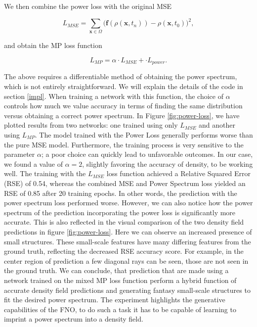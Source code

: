 \documentclass{article}
\begin{document}
We then combine the power loss with the original MSE

\begin{equation}
    L_{MSE} = \sum_{\mathbf{x} \in  \Omega} \Biggl(\mathbf{f}(\rho(\mathbf{x}, t_{n})) - \rho(\mathbf{x}, t_0)\Biggr)^2,
\end{equation}

and obtain the MP loss function

\begin{equation}
    L_{MP} = \alpha \cdot L_{MSE} + \cdot L_{power}.
\end{equation}

The above requires a differentiable method of obtaining the power spectrum, which is not entirely straightforward. We will explain the details of the code in section \ref{impl}. When training a network with this function, the choice of $\alpha$ controls how much we value accuracy in terms of finding the same distribution versus obtaining a correct power spectrum. In Figure \ref{fig:power-loss}, we have plotted results from two networks: one trained using only $L_{MSE}$ and another using $L_{MP}$. The model trained with the Power Loss generally performs worse than the pure MSE model. Furthermore, the training process is very sensitive to the parameter $\alpha$; a poor choice can quickly lead to unfavorable outcomes. In our case, we found a value of $\alpha=2$,  slightly favoring the accuracy of density, to be working well. The training with the $L_{MSE}$ loss function achieved a Relative Squared Error (RSE) of 0.54, whereas the combined MSE and Power Spectrum loss yielded an RSE of 0.85 after 20 training epochs. In other words, the prediction with the power spectrum loss performed worse. However, we can also notice how the power spectrum of the prediction incorporating the power loss is significantly more accurate. This is also reflected in the visual comparison of the two density field predictions in figure \ref{fig:power-loss}. Here we can observe an increased presence of small structures. These small-scale features have many differing features from the ground truth, reflecting the decreased RSE accuracy score. For example, in the center region of prediction a few diagonal rays can be seen, those are not seen in the ground truth. We can conclude, that prediction that are made using a network trained on the mixed MP loss function perform a hybrid function of accurate density field predictions and generating fantasy small-scale structures to fit the desired power spectrum. The experiment highlights the generative capabilities of the FNO, to do such a task it has to be capable of learning to imprint a power spectrum into a density field.
\end{document}
